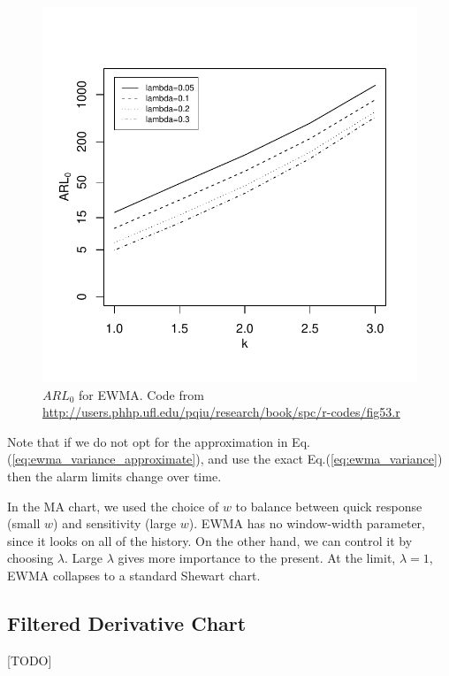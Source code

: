 \begin{figure}[h]
\centering
\includegraphics[height=0.3\textheight]{art/fig53}
\caption[$ARL_0$ for EWMA]{$ARL_0$ for EWMA. \newline Code from \url{http://users.phhp.ufl.edu/pqiu/research/book/spc/r-codes/fig53.r}}
\label{fig:arl_0_ewma}
\end{figure}

Note that if we do not opt for the approximation in Eq.(\ref{eq:ewma_variance_approximate}), and use the exact Eq.(\ref{eq:ewma_variance}) then the alarm limits change over time. 


In the MA chart, we used the choice of $w$ to balance between quick response (small $w$) and sensitivity (large $w$).
EWMA has no window-width parameter, since it looks on all of the history. On the other hand, we can control it by choosing $\lambda$. 
Large $\lambda$ gives more importance to the present. At the limit, $\lambda=1$, EWMA collapses to a standard Shewart chart.







\subsection{Filtered Derivative Chart}
[TODO]


